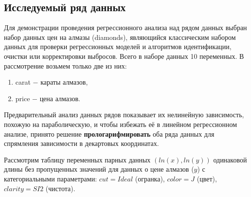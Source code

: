 \documentclass[
]{article}
\begin{document}
\hypertarget{ux438ux441ux441ux43bux435ux434ux443ux435ux43cux44bux439-ux440ux44fux434-ux434ux430ux43dux43dux44bux445}{%
\subsection{\texorpdfstring{\textbf{Исследуемый ряд
данных}}{Исследуемый ряд данных}}\label{ux438ux441ux441ux43bux435ux434ux443ux435ux43cux44bux439-ux440ux44fux434-ux434ux430ux43dux43dux44bux445}}

Для демонстрации проведения регрессионного анализа над рядом данных
выбран набор данных цен на алмазы (diamonds), являющийся классическим
набором данных для проверки регрессионных моделей и алгоритмов
идентификации, очистки или корректировки выбросов. Всего в наборе данных
10 переменных. В рассмотрение возьмем только две из них:

\begin{enumerate}
\def\labelenumi{\arabic{enumi}.}
\item
  carat \(-\) караты алмазов,
\item
  price \(-\) цена алмазов.
\end{enumerate}

Предварительный анализ данных рядов показывает их нелинейную
зависимость, похожую на параболическую, и чтобы избежать её в линейном
регрессионном анализе, принято решение \textbf{прологарифмировать} оба
ряда данных для спрямления зависимости в декартовых координатах.

Рассмотрим таблицу переменных парных данных
\(\left(ln(x), ln(y)\right)\) одинаковой длины без пропущенных значений
для данных о цене алмазов (\(y\)) с категориальными параметрами:
\(cut = Ideal\) (огранка), \(color = J\) (цвет), \(clarity = SI2\)
(чистота).
\end{document}
